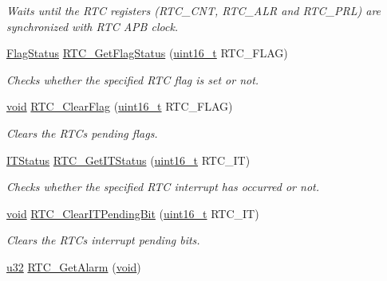 \begin{DoxyCompactItemize}
\begin{DoxyCompactList}\small\item\em Waits until the R\+TC registers (R\+T\+C\+\_\+\+C\+NT, R\+T\+C\+\_\+\+A\+LR and R\+T\+C\+\_\+\+P\+RL) are synchronized with R\+TC A\+PB clock. \end{DoxyCompactList}\item 
\hyperlink{agilefox_2library_2inc_2stm32f10x__type_8h_a89136caac2e14c55151f527ac02daaff}{Flag\+Status} \hyperlink{group___r_t_c___private___functions_ga21a85e5f846cb4552d5e76420779f3f6}{R\+T\+C\+\_\+\+Get\+Flag\+Status} (\hyperlink{_p_e___types_8h_a1f1825b69244eb3ad2c7165ddc99c956}{uint16\+\_\+t} R\+T\+C\+\_\+\+F\+L\+AG)
\begin{DoxyCompactList}\small\item\em Checks whether the specified R\+TC flag is set or not. \end{DoxyCompactList}\item 
\hyperlink{usb__devapi_8h_afabf60e7f57651d6d595a02c75f07cd0}{void} \hyperlink{group___r_t_c___private___functions_gacefb05730a77ffaa273c1ac3ade1a22f}{R\+T\+C\+\_\+\+Clear\+Flag} (\hyperlink{_p_e___types_8h_a1f1825b69244eb3ad2c7165ddc99c956}{uint16\+\_\+t} R\+T\+C\+\_\+\+F\+L\+AG)
\begin{DoxyCompactList}\small\item\em Clears the R\+TC\textquotesingle{}s pending flags. \end{DoxyCompactList}\item 
\hyperlink{agilefox_2library_2inc_2stm32f10x__type_8h_aacbd7ed539db0aacd973a0f6eca34074}{I\+T\+Status} \hyperlink{group___r_t_c___private___functions_ga23274ad8aa28e86d5b0d58eee295db21}{R\+T\+C\+\_\+\+Get\+I\+T\+Status} (\hyperlink{_p_e___types_8h_a1f1825b69244eb3ad2c7165ddc99c956}{uint16\+\_\+t} R\+T\+C\+\_\+\+IT)
\begin{DoxyCompactList}\small\item\em Checks whether the specified R\+TC interrupt has occurred or not. \end{DoxyCompactList}\item 
\hyperlink{usb__devapi_8h_afabf60e7f57651d6d595a02c75f07cd0}{void} \hyperlink{group___r_t_c___private___functions_ga62b9a04d89a11f28db7dcfd50d9ee768}{R\+T\+C\+\_\+\+Clear\+I\+T\+Pending\+Bit} (\hyperlink{_p_e___types_8h_a1f1825b69244eb3ad2c7165ddc99c956}{uint16\+\_\+t} R\+T\+C\+\_\+\+IT)
\begin{DoxyCompactList}\small\item\em Clears the R\+TC\textquotesingle{}s interrupt pending bits. \end{DoxyCompactList}\item 
\hyperlink{agilefox_2library_2inc_2stm32f10x__type_8h_a2caf5cd7bcdbe1eefa727f44ffb10bac}{u32} \hyperlink{iot-lab___m3_2library_2_s_t_m32_f10x___std_periph___lib___v3_85_80_2_libraries_2_s_t_m32_f10x___d1370fdc3a34d2660f4389a493e014ba_ab783d977e5de7f270bb8958d68762923}{R\+T\+C\+\_\+\+Get\+Alarm} (\hyperlink{usb__devapi_8h_afabf60e7f57651d6d595a02c75f07cd0}{void})
\end{DoxyCompactItemize}


